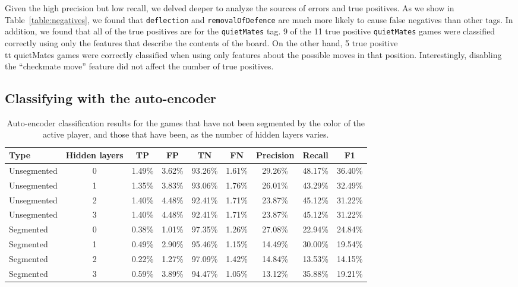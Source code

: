 \documentclass[11pt]{article}
\begin{document}
Given the high precision but low recall, we delved deeper to analyze the sources of errors and true positives. As we show in Table~\ref{table:negatives}, we found that {\tt deflection} and {\tt removalOfDefence} are much more likely to cause false negatives than other tags. In addition, we found that all of the true positives are for the {\tt quietMates} tag. 9 of the 11 true positive {\tt quietMates} games were classified correctly using only the features that describe the contents of the board. On the other hand, 5 true positive {\\tt quietMates} games were correctly classified when using only features about the possible moves in that position. Interestingly, disabling the ``checkmate move'' feature did not affect the number of true positives.

\subsection{Classifying with the auto-encoder}
\begin{table*}
\centering
\begin{tabular}{lcccccccc}
\hline
\textbf{Type} & \textbf{Hidden layers} & \textbf{TP} & \textbf{FP} & \textbf{TN} & \textbf{FN} & \textbf{Precision} & \textbf{Recall} & \textbf{F1} \\ \hline
Unsegmented & 0 & 1.49\% & 3.62\% & 93.26\% & 1.61\% & 29.26\% & 48.17\% & 36.40\% \\
Unsegmented & 1 & 1.35\% & 3.83\% & 93.06\% & 1.76\% & 26.01\% & 43.29\% & 32.49\% \\
Unsegmented & 2 & 1.40\% & 4.48\% & 92.41\% & 1.71\% & 23.87\% & 45.12\% & 31.22\% \\
Unsegmented & 3 & 1.40\% & 4.48\% & 92.41\% & 1.71\% & 23.87\% & 45.12\% & 31.22\% \\
\hline
Segmented & 0 & 0.38\% & 1.01\% & 97.35\% & 1.26\% & 27.08\% & 22.94\% & 24.84\% \\
Segmented & 1 & 0.49\% & 2.90\% & 95.46\% & 1.15\% & 14.49\% & 30.00\% & 19.54\% \\
Segmented & 2 & 0.22\% & 1.27\% & 97.09\% & 1.42\% & 14.84\% & 13.53\% & 14.15\% \\
Segmented & 3 & 0.59\% & 3.89\% & 94.47\% & 1.05\% & 13.12\% & 35.88\% & 19.21\% \\
\end{tabular} 
\caption{Auto-encoder classification results for the games that have not been segmented by the color of the active player, and those that have been, as the number of hidden layers varies.}
\label{table:auto-encoder-results}
\end{table*}
\end{document}
